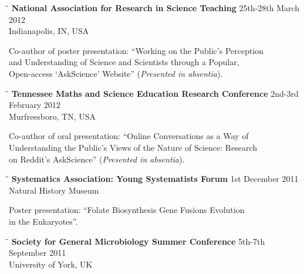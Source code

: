 \documentclass{res}
\begin{document}
\begin{resume}
  
   \begin{tabbing}
   \hspace{2in}\= \hspace{2.6in}\= \kill 
    {\bf National Association for Research in Science Teaching } \>  \> 25th-28th March 2012\\
                        \>     \> Indianapolis, IN, USA
   \end{tabbing}\vspace{-30pt}      
 Co-author of poster presentation: ``Working on the Public's Perception \\and Understanding of Science and Scientists
through a Popular, \\Open-access `AskScience' Website'' (\emph{Presented in absentia}).
    \begin{tabbing}
   \hspace{2in}\= \hspace{2.6in}\= \kill 
    {\bf Tennessee Maths and Science Education Research Conference} \>  \> 2nd-3rd February 2012\\
                        \>     \> Murfreesboro, TN, USA
   \end{tabbing}\vspace{-30pt}     
   Co-author of oral presentation: ``Online Conversations as a Way of\\ Understanding the Public's Views of the Nature of Science: Research \\on Reddit's AskScience'' (\emph{Presented in absentia}).
 
  \begin{tabbing}
   \hspace{2in}\= \hspace{2.6in}\= \kill 
    {\bf Systematics Association: Young Systematists Forum} \>  \> 1st December 2011\\
                        \>     \> Natural History Museum
   \end{tabbing}\vspace{-30pt}      
   
   Poster presentation: ``Folate Biosynthesis Gene Fusions Evolution \\in the Eukaryotes''.
      
    \begin{tabbing}
   \hspace{2in}\= \hspace{2.6in}\= \kill 
    {\bf Society for General Microbiology Summer Conference} \> \>5th-7th September 2011\\
                          \>   \> University of York, UK


\end{tabbing}
\end{resume}
\end{document}
